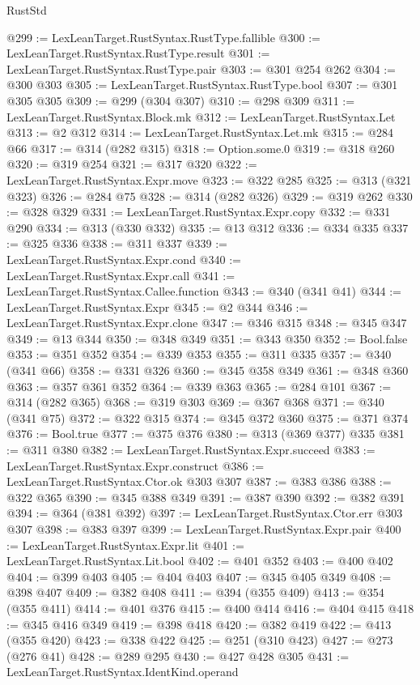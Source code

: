 \begin{lexlean}{RustStd}
\begin{coremodule}
@299 := LexLeanTarget.RustSyntax.RustType.fallible
@300 := LexLeanTarget.RustSyntax.RustType.result
@301 := LexLeanTarget.RustSyntax.RustType.pair
@303 := @301 @254 @262
@304 := @300 @303
@305 := LexLeanTarget.RustSyntax.RustType.bool
@307 := @301 @305 @305
@309 := @299 (@304 @307)
@310 := @298 @309
@311 := LexLeanTarget.RustSyntax.Block.mk
@312 := LexLeanTarget.RustSyntax.Let
@313 := @2 @312
@314 := LexLeanTarget.RustSyntax.Let.mk
@315 := @284 @66
@317 := @314 (@282 @315)
@318 := Option.some.{0}
@319 := @318 @260
@320 := @319 @254
@321 := @317 @320
@322 := LexLeanTarget.RustSyntax.Expr.move
@323 := @322 @285
@325 := @313 (@321 @323)
@326 := @284 @75
@328 := @314 (@282 @326)
@329 := @319 @262
@330 := @328 @329
@331 := LexLeanTarget.RustSyntax.Expr.copy
@332 := @331 @290
@334 := @313 (@330 @332)
@335 := @13 @312
@336 := @334 @335
@337 := @325 @336
@338 := @311 @337
@339 := LexLeanTarget.RustSyntax.Expr.cond
@340 := LexLeanTarget.RustSyntax.Expr.call
@341 := LexLeanTarget.RustSyntax.Callee.function
@343 := @340 (@341 @41)
@344 := LexLeanTarget.RustSyntax.Expr
@345 := @2 @344
@346 := LexLeanTarget.RustSyntax.Expr.clone
@347 := @346 @315
@348 := @345 @347
@349 := @13 @344
@350 := @348 @349
@351 := @343 @350
@352 := Bool.false
@353 := @351 @352
@354 := @339 @353
@355 := @311 @335
@357 := @340 (@341 @66)
@358 := @331 @326
@360 := @345 @358 @349
@361 := @348 @360
@363 := @357 @361 @352
@364 := @339 @363
@365 := @284 @101
@367 := @314 (@282 @365)
@368 := @319 @303
@369 := @367 @368
@371 := @340 (@341 @75)
@372 := @322 @315
@374 := @345 @372 @360
@375 := @371 @374
@376 := Bool.true
@377 := @375 @376
@380 := @313 (@369 @377) @335
@381 := @311 @380
@382 := LexLeanTarget.RustSyntax.Expr.succeed
@383 := LexLeanTarget.RustSyntax.Expr.construct
@386 := LexLeanTarget.RustSyntax.Ctor.ok @303 @307
@387 := @383 @386
@388 := @322 @365
@390 := @345 @388 @349
@391 := @387 @390
@392 := @382 @391
@394 := @364 (@381 @392)
@397 := LexLeanTarget.RustSyntax.Ctor.err @303 @307
@398 := @383 @397
@399 := LexLeanTarget.RustSyntax.Expr.pair
@400 := LexLeanTarget.RustSyntax.Expr.lit
@401 := LexLeanTarget.RustSyntax.Lit.bool
@402 := @401 @352
@403 := @400 @402
@404 := @399 @403
@405 := @404 @403
@407 := @345 @405 @349
@408 := @398 @407
@409 := @382 @408
@411 := @394 (@355 @409)
@413 := @354 (@355 @411)
@414 := @401 @376
@415 := @400 @414
@416 := @404 @415
@418 := @345 @416 @349
@419 := @398 @418
@420 := @382 @419
@422 := @413 (@355 @420)
@423 := @338 @422
@425 := @251 (@310 @423)
@427 := @273 (@276 @41)
@428 := @289 @295
@430 := @427 @428 @305
@431 := LexLeanTarget.RustSyntax.IdentKind.operand

\end{coremodule}
\end{lexlean}
